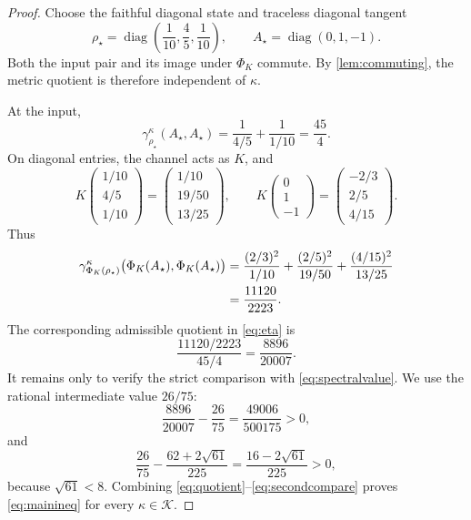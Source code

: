 \documentclass[10pt,a4paper]{amsart}
\newcommand{\PhiK}{\Phi_K}
\DeclareMathOperator{\diag}{diag}
\begin{document}
\begin{proof}
Choose the faithful diagonal state and traceless diagonal tangent
\begin{equation}\label{eq:witness}
 \rho_\star
 =\diag\!\left(\frac1{10},\frac45,\frac1{10}\right),
 \qquad
 A_\star=\diag(0,1,-1).
\end{equation}
Both the input pair and its image under $\PhiK$ commute. By \cref{lem:commuting}, the metric quotient is therefore independent of $\kappa$.

At the input,
\begin{equation}\label{eq:inputmetric}
 \gamma_{\rho_\star}^\kappa(A_\star,A_\star)
 =\frac{1}{4/5}+\frac{1}{1/10}
 =\frac{45}{4}.
\end{equation}
On diagonal entries, the channel acts as $K$, and
\begin{equation}\label{eq:images}
 K
 \begin{pmatrix}1/10\\[1mm]4/5\\[1mm]1/10\end{pmatrix}
 =\begin{pmatrix}1/10\\[1mm]19/50\\[1mm]13/25\end{pmatrix},
 \qquad
 K
 \begin{pmatrix}0\\[1mm]1\\[1mm]-1\end{pmatrix}
 =\begin{pmatrix}-2/3\\[1mm]2/5\\[1mm]4/15\end{pmatrix}.
\end{equation}
Thus
\begin{align}
 \gamma_{\PhiK(\rho_\star)}^\kappa
 \bigl(\PhiK(A_\star),\PhiK(A_\star)\bigr)
 &=\frac{(2/3)^2}{1/10}
   +\frac{(2/5)^2}{19/50}
   +\frac{(4/15)^2}{13/25} \notag\\
 &=\frac{11120}{2223}.
 \label{eq:outputmetric}
\end{align}
The corresponding admissible quotient in \eqref{eq:eta} is
\begin{equation}\label{eq:quotient}
 \frac{11120/2223}{45/4}
 =\frac{8896}{20007}.
\end{equation}
It remains only to verify the strict comparison with \eqref{eq:spectralvalue}. We use the rational intermediate value $26/75$:
\begin{equation}\label{eq:firstcompare}
 \frac{8896}{20007}-\frac{26}{75}
 =\frac{49006}{500175}>0,
\end{equation}
and
\begin{equation}\label{eq:secondcompare}
 \frac{26}{75}-\frac{62+2\sqrt{61}}{225}
 =\frac{16-2\sqrt{61}}{225}>0,
\end{equation}
because $\sqrt{61}<8$. Combining \eqref{eq:quotient}--\eqref{eq:secondcompare} proves \eqref{eq:mainineq} for every $\kappa\in\mathcal K$.
\end{proof}
\end{document}
